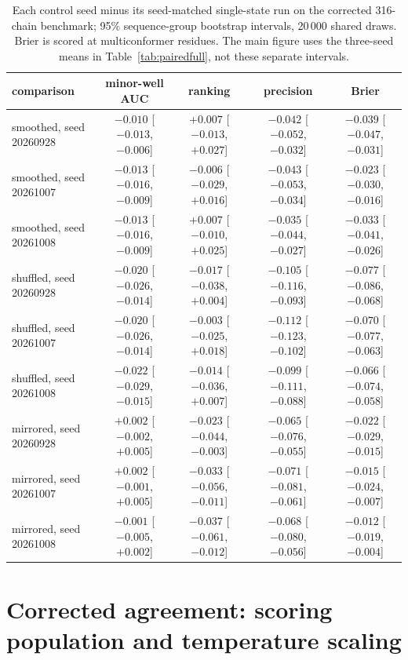 \documentclass[10pt,a4paper]{article}
\begin{document}
\begin{table}[!htbp]
\centering
\caption{Each control seed minus its seed-matched single-state run on the corrected 316-chain benchmark; 95\% sequence-group bootstrap intervals, 20\,000 shared draws. Brier is scored at multiconformer residues. The main figure uses the three-seed means in Table~\ref{tab:pairedfull}, not these separate intervals.}
\label{tab:scratchcontrols}
\scriptsize\setlength{\tabcolsep}{3pt}
\begin{tabular}{@{}lcccc@{}}
\toprule
comparison & minor-well AUC & ranking & precision & Brier \\
\midrule
smoothed, seed 20260928 & $-0.010$ [$-0.013$, $-0.006$] & $+0.007$ [$-0.013$, $+0.027$] & $-0.042$ [$-0.052$, $-0.032$] & $-0.039$ [$-0.047$, $-0.031$] \\
smoothed, seed 20261007 & $-0.013$ [$-0.016$, $-0.009$] & $-0.006$ [$-0.029$, $+0.016$] & $-0.043$ [$-0.053$, $-0.034$] & $-0.023$ [$-0.030$, $-0.016$] \\
smoothed, seed 20261008 & $-0.013$ [$-0.016$, $-0.009$] & $+0.007$ [$-0.010$, $+0.025$] & $-0.035$ [$-0.044$, $-0.027$] & $-0.033$ [$-0.041$, $-0.026$] \\
shuffled, seed 20260928 & $-0.020$ [$-0.026$, $-0.014$] & $-0.017$ [$-0.038$, $+0.004$] & $-0.105$ [$-0.116$, $-0.093$] & $-0.077$ [$-0.086$, $-0.068$] \\
shuffled, seed 20261007 & $-0.020$ [$-0.026$, $-0.014$] & $-0.003$ [$-0.025$, $+0.018$] & $-0.112$ [$-0.123$, $-0.102$] & $-0.070$ [$-0.077$, $-0.063$] \\
shuffled, seed 20261008 & $-0.022$ [$-0.029$, $-0.015$] & $-0.014$ [$-0.036$, $+0.007$] & $-0.099$ [$-0.111$, $-0.088$] & $-0.066$ [$-0.074$, $-0.058$] \\
mirrored, seed 20260928 & $+0.002$ [$-0.002$, $+0.005$] & $-0.023$ [$-0.044$, $-0.003$] & $-0.065$ [$-0.076$, $-0.055$] & $-0.022$ [$-0.029$, $-0.015$] \\
mirrored, seed 20261007 & $+0.002$ [$-0.001$, $+0.005$] & $-0.033$ [$-0.056$, $-0.011$] & $-0.071$ [$-0.081$, $-0.061$] & $-0.015$ [$-0.024$, $-0.007$] \\
mirrored, seed 20261008 & $-0.001$ [$-0.005$, $+0.002$] & $-0.037$ [$-0.061$, $-0.012$] & $-0.068$ [$-0.080$, $-0.056$] & $-0.012$ [$-0.019$, $-0.004$] \\
\bottomrule
\end{tabular}
\end{table}

\section{Corrected agreement: scoring population and temperature scaling}
\label{sec:correctedagreement}
\end{document}
